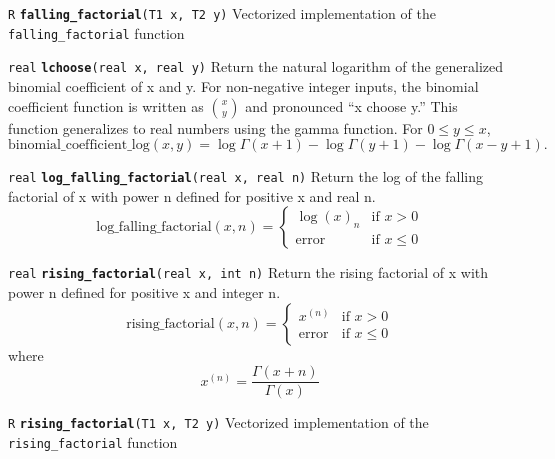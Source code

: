 \documentclass[
  10pt,
]{book}
\begin{document}

\texttt{R} \textbf{\texttt{falling\_factorial}}\texttt{(T1\ x,\ T2\ y)}\newline
Vectorized implementation of the \texttt{falling\_factorial} function


\texttt{real} \textbf{\texttt{lchoose}}\texttt{(real\ x,\ real\ y)}\newline
Return the natural logarithm of the generalized binomial coefficient
of x and y. For non-negative integer inputs, the binomial coefficient
function is written as \(\binom{x}{y}\) and pronounced ``x choose y.''
This function generalizes to real numbers using the gamma function.
For \(0 \leq y \leq x\), \[ \mathrm{binomial\_coefficient\_log}(x,y) =
\log\Gamma(x+1) - \log\Gamma(y+1) - \log\Gamma(x-y+1). \]


\texttt{real} \textbf{\texttt{log\_falling\_factorial}}\texttt{(real\ x,\ real\ n)}\newline
Return the log of the falling factorial of x with power n defined for
positive x and real n.~\[ \mathrm{log\_falling\_factorial}(x,n) =
\begin{cases} \log (x)_n & \text{if } x > 0 \\ \textrm{error} &
\text{if } x \leq 0 \end{cases} \]


\texttt{real} \textbf{\texttt{rising\_factorial}}\texttt{(real\ x,\ int\ n)}\newline
Return the rising factorial of x with power n defined for positive x
and integer n.~\[ \mathrm{rising\_factorial}(x,n) = \begin{cases} x^{(n)}
& \text{if } x > 0 \\ \textrm{error} & \text{if } x \leq 0 \end{cases}
\] where \[ x^{(n)}=\frac{\Gamma(x+n)}{\Gamma(x)} \]


\texttt{R} \textbf{\texttt{rising\_factorial}}\texttt{(T1\ x,\ T2\ y)}\newline
Vectorized implementation of the \texttt{rising\_factorial} function
\end{document}
